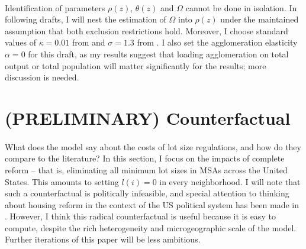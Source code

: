 \documentclass[]{article}
\begin{document}
\paragraph*{}
Identification of parameters $\rho(z)$, $\theta(z)$ and $\Omega$ cannot be done in isolation. In following drafts, I will nest the estimation of $\Omega$ into $\rho(z)$ under the maintained assumption that both exclusion restrictions hold. Moreover, I choose standard values of $\kappa = 0.01$ from \cite{berlinwall} and $\sigma = 1.3$ from \cite{card}. I also set the agglomeration elasticity $\alpha = 0$ for this draft, as my results suggest that loading agglomeration on total output or total population will matter significantly for the results; more discussion is needed.



\section{(PRELIMINARY) Counterfactual}\label{Section:Results}
\paragraph*{}
What does the model say about the costs of lot size regulations, and how do they compare to the literature? In this section, I focus on the impacts of complete reform -- that is, eliminating all minimum lot sizes in MSAs across the United States. This amounts to setting $l(i) = 0$ in every neighborhood. I will note that such a counterfactual is politically infeasible, and special attention to thinking about housing reform in the context of the US political system has been made in \cite{parkho}. However, I think this radical counterfactual is useful because it is easy to compute, despite the rich heterogeneity and microgeographic scale of the model. Further iterations of this paper will be less ambitious.   
\end{document}
